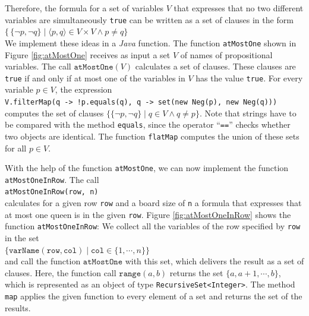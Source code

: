 \noindent
Therefore, the formula for a set of variables $V$ that expresses that no two different
variables are simultaneously \texttt{true} can be written as a set of clauses in the form
\\[0.2cm]
\hspace*{1.3cm}
$\bigl\{\, \{ \neg p, \neg q \} \;|\; \langle p, q \rangle \in V \times V \wedge p \neq q \bigr\}$
\\[0.2cm]
We implement these ideas in a \textsl{Java} function. The function \texttt{atMostOne} shown in Figure
\ref{fig:atMostOne} receives as input a set $V$ of names of propositional variables. The call $\texttt{atMostOne}(V)$
calculates a set of clauses. These clauses are \texttt{true} if and only if at most one of the variables in $V$
has the value \texttt{true}.  For every variable $p \in V$, the expression
\\[0.2cm]
\hspace*{1.3cm}
\texttt{V.filterMap(q -> !p.equals(q), q -> set(new Neg(p), new Neg(q)))}
\\[0.2cm]
computes the set of clauses $\bigl\{ \{ \neg p, \neg q \} \mid q \in V \wedge q \neq p \bigr\}$.  Note that
strings have to be compared with the method \texttt{equals}, since the operator ``\texttt{==}'' checks whether
two objects are identical.  The function \texttt{flatMap} computes the union of these sets for all $p \in V$.

With the help of the function \texttt{atMostOne}, we can now implement the function
\texttt{atMostOneInRow}. The call \\[0.2cm]
\hspace*{1.3cm} 
\texttt{atMostOneInRow(row, n)} \\[0.2cm]
calculates for a given row \texttt{row} and a board size of \texttt{n} a formula
that expresses that at most one queen is in the given \texttt{row}.
Figure \ref{fig:atMostOneInRow} shows the
function \texttt{atMostOneInRow}: We collect all the variables of the row specified by \texttt{row}
in the set 
\\[0.2cm]
\hspace*{1.3cm}
$\bigl\{ \texttt{varName}(\texttt{row}, \mathtt{col}) \mid \mathtt{col} \in \{1, \cdots, n \} \bigr\}$
\\[0.2cm]
and call the function $\texttt{atMostOne}$ with this set, which delivers the result
as a set of clauses.  Here, the function call $\texttt{range}(a, b)$ returns the set $\{a, a+1, \cdots, b\}$,
which is represented as an object of type \texttt{RecursiveSet<Integer>}.  The method \texttt{map} applies the
given function to every element of a set and returns the set of the results.

